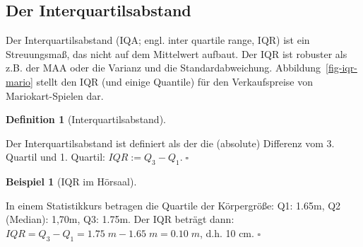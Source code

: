 \documentclass[
  letterpaper,
  oneside,
  open=any]{scrbook}
\theoremstyle{definition}
\theoremstyle{definition}
\newtheorem{example}{Beispiel}[chapter]
\theoremstyle{definition}
\newtheorem{definition}{Definition}[chapter]
\theoremstyle{remark}
\begin{document}
\subsection{Der Interquartilsabstand}\label{der-interquartilsabstand}

Der Interquartilsabstand (IQA; engl. inter quartile range, IQR) ist ein
Streuungsmaß, das nicht auf dem Mittelwert aufbaut. Der IQR ist robuster
als z.B. der MAA oder die Varianz und die Standardabweichung.
Abbildung~\ref{fig-iqr-mario} stellt den IQR (und einige Quantile) für
den Verkaufspreise von Mariokart-Spielen dar.

\begin{definition}[Interquartilsabstand]\protect\hypertarget{def-iqr}{}\label{def-iqr}

Der Interquartilsabstand ist definiert als der die (absolute) Differenz
vom 3. Quartil und 1. Quartil: \(IQR := Q_3-Q_1. \; \square\)

\end{definition}

\begin{example}[IQR im
Hörsaal]\protect\hypertarget{exm-iqr}{}\label{exm-iqr}

In einem Statistikkurs betragen die Quartile der Körpergröße: Q1: 1.65m,
Q2 (Median): 1,70m, Q3: 1.75m. Der IQR beträgt dann:
\(IQR = Q_3-Q_1 = 1.75 \; m - 1.65\;  m = 0.10\; m\), d.h. 10 cm.
\(\square\)

\end{example}
\end{document}
